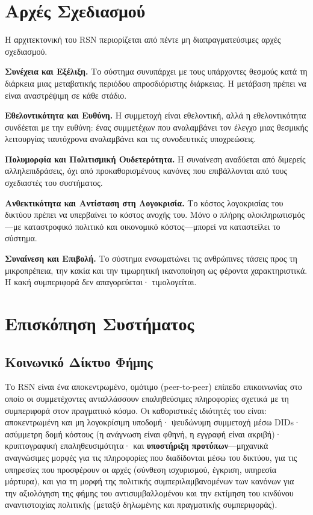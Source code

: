 \documentclass[11pt,a4paper,twocolumn]{article}
\begin{document}
\section{Αρχές Σχεδιασμού}

Η αρχιτεκτονική του RSN περιορίζεται από πέντε μη διαπραγματεύσιμες αρχές σχεδιασμού.

\textbf{Συνέχεια και Εξέλιξη.} Το σύστημα συνυπάρχει με τους υπάρχοντες θεσμούς κατά τη διάρκεια μιας μεταβατικής περιόδου απροσδιόριστης διάρκειας. Η μετάβαση πρέπει να είναι αναστρέψιμη σε κάθε στάδιο.

\textbf{Εθελοντικότητα και Ευθύνη.} Η συμμετοχή είναι εθελοντική, αλλά η εθελοντικότητα συνδέεται με την ευθύνη: ένας συμμετέχων που αναλαμβάνει τον έλεγχο μιας θεσμικής λειτουργίας ταυτόχρονα αναλαμβάνει και τις συνοδευτικές υποχρεώσεις.

\textbf{Πολυμορφία και Πολιτισμική Ουδετερότητα.} Η συναίνεση αναδύεται από διμερείς αλληλεπιδράσεις, όχι από προκαθορισμένους κανόνες που επιβάλλονται από τους σχεδιαστές του συστήματος.

\textbf{Ανθεκτικότητα και Αντίσταση στη Λογοκρισία.} Το κόστος λογοκρισίας του δικτύου πρέπει να υπερβαίνει το κόστος ανοχής του. Μόνο ο πλήρης ολοκληρωτισμός---με καταστροφικό πολιτικό και οικονομικό κόστος---μπορεί να καταστείλει το σύστημα.

\textbf{Συναίνεση και Επιβολή.} Το σύστημα ενσωματώνει τις ανθρώπινες τάσεις προς τη μικροπρέπεια, την κακία και την τιμωρητική ικανοποίηση ως φέροντα χαρακτηριστικά. Η κακή συμπεριφορά δεν απαγορεύεται· τιμολογείται.

\section{Επισκόπηση Συστήματος}

\subsection{Κοινωνικό Δίκτυο Φήμης}

Το RSN είναι ένα αποκεντρωμένο, ομότιμο (peer-to-peer) επίπεδο επικοινωνίας στο οποίο οι συμμετέχοντες ανταλλάσσουν επαληθεύσιμες πληροφορίες σχετικά με τη συμπεριφορά στον πραγματικό κόσμο. Οι καθοριστικές ιδιότητές του είναι: αποκεντρωμένη και μη λογοκρίσιμη υποδομή· ψευδώνυμη συμμετοχή μέσω DIDs· ασύμμετρη δομή κόστους (η ανάγνωση είναι φθηνή, η εγγραφή είναι ακριβή)· κρυπτογραφική επαληθευσιμότητα· και \textbf{υποστήριξη προτύπων}---μηχανικά αναγνώσιμες μορφές για τις πληροφορίες που διαδίδονται μέσω του δικτύου, για τις υπηρεσίες που προσφέρουν οι αρχές (σύνθεση ισχυρισμού, έγκριση, υπηρεσία μάρτυρα), και για τη μορφή της πολιτικής συμπεριλαμβανομένων των κανόνων για την αξιολόγηση της φήμης του αντισυμβαλλομένου και την εκτίμηση του κινδύνου αναντιστοιχίας πολιτικής (μεταξύ δηλωμένης και πραγματικής συμπεριφοράς).
\end{document}
